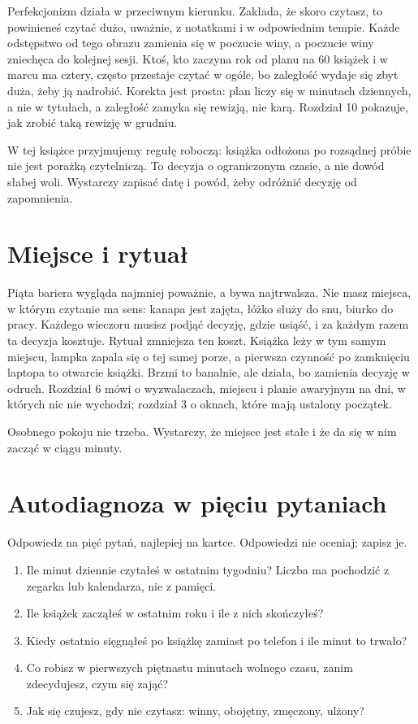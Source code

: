 Perfekcjonizm działa w przeciwnym kierunku. Zakłada, że skoro czytasz, to powinieneś czytać dużo, uważnie, z notatkami i w odpowiednim tempie. Każde odstępstwo od tego obrazu zamienia się w poczucie winy, a poczucie winy zniechęca do kolejnej sesji. Ktoś, kto zaczyna rok od planu na 60 książek i w marcu ma cztery, często przestaje czytać w ogóle, bo zaległość wydaje się zbyt duża, żeby ją nadrobić. Korekta jest prosta: plan liczy się w minutach dziennych, a nie w tytułach, a zaległość zamyka się rewizją, nie karą. Rozdział 10 pokazuje, jak zrobić taką rewizję w grudniu.

\begin{zasada}
W tej książce przyjmujemy regułę roboczą: książka odłożona po rozsądnej próbie nie jest porażką czytelniczą. To decyzja o ograniczonym czasie, a nie dowód słabej woli. Wystarczy zapisać datę i powód, żeby odróżnić decyzję od zapomnienia.
\end{zasada}

\section{Miejsce i rytuał}

Piąta bariera wygląda najmniej poważnie, a bywa najtrwalsza. Nie masz miejsca, w którym czytanie ma sens: kanapa jest zajęta, łóżko służy do snu, biurko do pracy. Każdego wieczoru musisz podjąć decyzję, gdzie usiąść, i za każdym razem ta decyzja kosztuje. Rytuał zmniejsza ten koszt. Książka leży w tym samym miejscu, lampka zapala się o tej samej porze, a pierwsza czynność po zamknięciu laptopa to otwarcie książki. Brzmi to banalnie, ale działa, bo zamienia decyzję w odruch. Rozdział 6 mówi o wyzwalaczach, miejscu i planie awaryjnym na dni, w których nic nie wychodzi; rozdział 3 o oknach, które mają ustalony początek.

Osobnego pokoju nie trzeba. Wystarczy, że miejsce jest stałe i że da się w nim zacząć w ciągu minuty.

\section{Autodiagnoza w pięciu pytaniach}

Odpowiedz na pięć pytań, najlepiej na kartce. Odpowiedzi nie oceniaj; zapisz je.

\begin{enumerate}
\item Ile minut dziennie czytałeś w ostatnim tygodniu? Liczba ma pochodzić z zegarka lub kalendarza, nie z pamięci.
\item Ile książek zacząłeś w ostatnim roku i ile z nich skończyłeś?
\item Kiedy ostatnio sięgnąłeś po książkę zamiast po telefon i ile minut to trwało?
\item Co robisz w pierwszych piętnastu minutach wolnego czasu, zanim zdecydujesz, czym się zająć?
\item Jak się czujesz, gdy nie czytasz: winny, obojętny, zmęczony, ulżony?
\end{enumerate}

